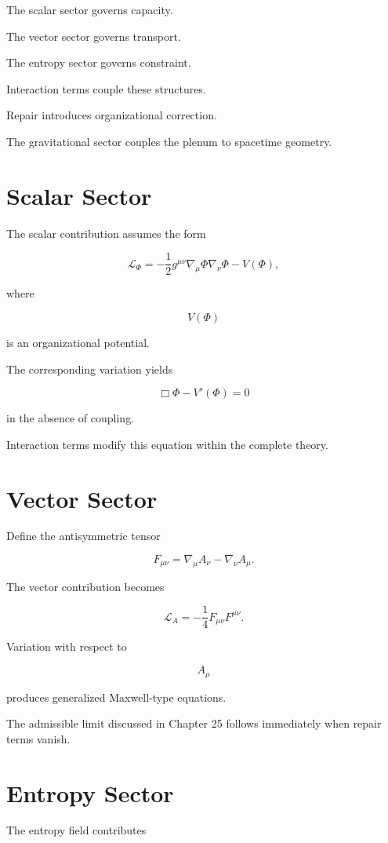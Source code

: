 \documentclass[11pt,oneside]{book}
\numberwithin{equation}{chapter}
\theoremstyle{definition}
\theoremstyle{plain}
\begin{document}
The scalar sector governs capacity.

The vector sector governs transport.

The entropy sector governs constraint.

Interaction terms couple these structures.

Repair introduces organizational correction.

The gravitational sector couples the plenum to spacetime geometry.

\section{Scalar Sector}

The scalar contribution assumes the form

\[
\mathcal L_\Phi
=
-\frac12
g^{\mu\nu}
\nabla_\mu\Phi
\nabla_\nu\Phi
-
V(\Phi),
\]

where

\[
V(\Phi)
\]

is an organizational potential.

The corresponding variation yields

\[
\Box\Phi
-
V'(\Phi)
=
0
\]

in the absence of coupling.

Interaction terms modify this equation within the complete theory.

\section{Vector Sector}

Define the antisymmetric tensor

\[
F_{\mu\nu}
=
\nabla_\mu A_\nu
-
\nabla_\nu A_\mu.
\]

The vector contribution becomes

\[
\mathcal L_A
=
-
\frac14
F_{\mu\nu}
F^{\mu\nu}.
\]

Variation with respect to

\[
A_\mu
\]

produces generalized Maxwell-type equations.

The admissible limit discussed in Chapter 25 follows immediately when
repair terms vanish.

\section{Entropy Sector}

The entropy field contributes
\end{document}
